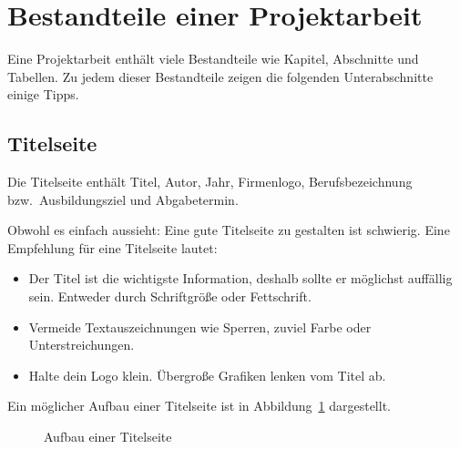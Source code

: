 \documentclass[a4paper,titlepage=true,twoside]{scrartcl}
\begin{document}
\section{Bestandteile einer Projektarbeit}
Eine Projektarbeit enthält viele Bestandteile wie Kapitel, Abschnitte und Tabellen.
Zu jedem dieser Bestandteile zeigen die folgenden Unterabschnitte einige Tipps.

\subsection{Titelseite}
Die Titelseite enthält Titel, Autor, Jahr, Firmenlogo, Berufsbezeichnung 
bzw.\ Ausbildungsziel und Abgabetermin.

Obwohl es einfach aussieht: Eine gute Titelseite zu gestalten ist schwierig. 
Eine Empfehlung für eine Titelseite lautet:

\begin{itemize}
 \item Der Titel ist die wichtigste Information, deshalb sollte er möglichst auffällig sein.
  Entweder durch Schriftgröße oder Fettschrift.
 \item Vermeide Textauszeichnungen wie Sperren, zuviel Farbe oder Unterstreichungen.
 \item Halte dein Logo klein. Übergroße Grafiken lenken vom Titel ab. 
\end{itemize}

Ein möglicher Aufbau einer Titelseite ist in Abbildung~\ref{fig.titleseite}
dargestellt.

\begin{figure}[tb]
 \caption{Aufbau einer Titelseite\label{fig.titleseite}}
\end{figure}
\end{document}

